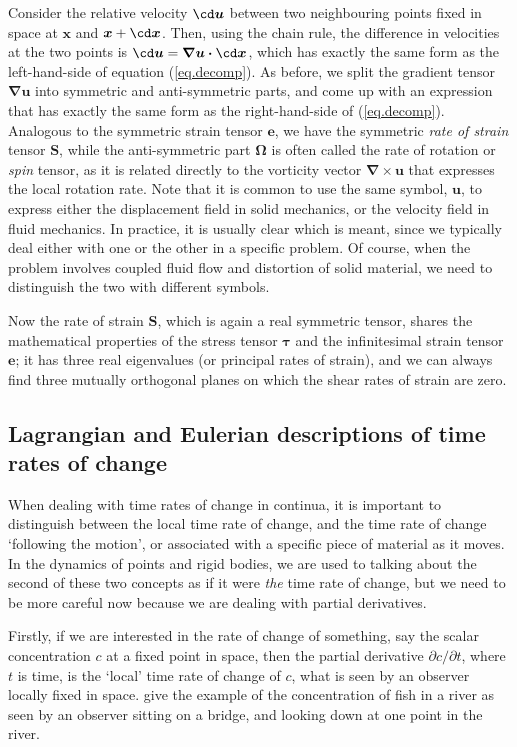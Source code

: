 \documentclass[twoside,11pt]		{report}
\begin{document}
Consider the relative velocity $\cd\bm{u}$ between two neighbouring
points fixed in space at $\bm{x}$ and $\bm{x}+\cd\bm{x}$. Then, using
the chain rule, the difference in velocities at the two points is
$\cd\bm{u}=\bm{\nabla u\cdot}\cd\bm{x}$, which has exactly the same
form as the left-hand-side of equation (\ref{eq.decomp}). As before,
we split the gradient tensor $\bm{\nabla u}$ into symmetric and
anti-symmetric parts, and come up with an expression that has exactly
the same form as the right-hand-side of (\ref{eq.decomp}). Analogous
to the symmetric strain tensor $\bm{e}$, we have the symmetric
\emph{rate of strain} tensor $\bm{S}$, while the anti-symmetric part
$\bm{\Omega}$ is often called the rate of rotation or \emph{spin}
tensor, as it is related directly to the vorticity vector
$\bm{\nabla}\times\bm{u}$ that expresses the local rotation rate. Note
that it is common to use the same symbol, $\bm{u}$, to express either
the displacement field in solid mechanics, or the velocity field in
fluid mechanics. In practice, it is usually clear which is meant,
since we typically deal either with one or the other in a specific
problem. Of course, when the problem involves coupled fluid flow and
distortion of solid material, we need to distinguish the two with
different symbols.

Now the rate of strain $\bm{S}$, which is again a real symmetric
tensor, shares the mathematical properties of the stress tensor
$\bm{\tau}$ and the infinitesimal strain tensor $\bm{e}$; it has three
real eigenvalues (or principal rates of strain), and we can always
find three mutually orthogonal planes on which the shear rates of
strain are zero.

\subsection{Lagrangian and Eulerian descriptions of time rates of
  change}

When dealing with time rates of change in continua, it is important to
distinguish between the local time rate of change, and the time rate
of change `following the motion', or associated with a specific piece
of material as it moves. In the dynamics of points and rigid bodies,
we are used to talking about the second of these two concepts as if it
were \emph{the} time rate of change, but we need to be more careful
now because we are dealing with partial derivatives.

Firstly, if we are interested in the rate of change of something, say
the scalar concentration $c$ at a fixed point in space, then the
partial derivative $\partial c/\partial t$, where $t$ is time, is the
`local' time rate of change of $c$, \ie what is seen by an observer
locally fixed in space. \citet*{bsl62} give the example of the
concentration of fish in a river as seen by an observer sitting on a
bridge, and looking down at one point in the river.
\end{document}
